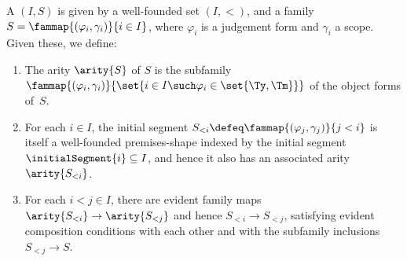 \begin{definition}
  \label{def:well-founded-premises-shape}%
  A  $(I, S)$ is given by
  a well-founded set $(I, {<})$, and
  a family $S = \fammap{(\varphi_i,\gamma_i)}{i \in I}$, where $\varphi_i$ is a judgement form and $\gamma_i$ a scope.
  Given these, we define:
  \begin{enumerate}
  \item
    The arity $\arity{S}$ of $S$ is the subfamily $\fammap{(\varphi_i, \gamma_i)}{\set{i \in I \such \varphi_i \in \set{\Ty, \Tm}}}$ of the object forms of~$S$.

  \item
    For each $i \in I$, the initial segment $S_{<i} \defeq \fammap{(\varphi_j, \gamma_j)}{j < i}$ is itself a well-founded premises-shape indexed by the initial segment $\initialSegment{i} \subseteq I$, and hence it also has an associated arity $\arity{S_{< i}}$.

  \item
    For each $i < j \in I$, there are evident family maps $\arity{S_{<i}} \to \arity{S_{<j}}$ and hence $S_{<i} \to S_{<j}$, satisfying evident composition conditions with each other and with the subfamily inclusions $S_{<j} \to S$.
  \end{enumerate}
\end{definition}

